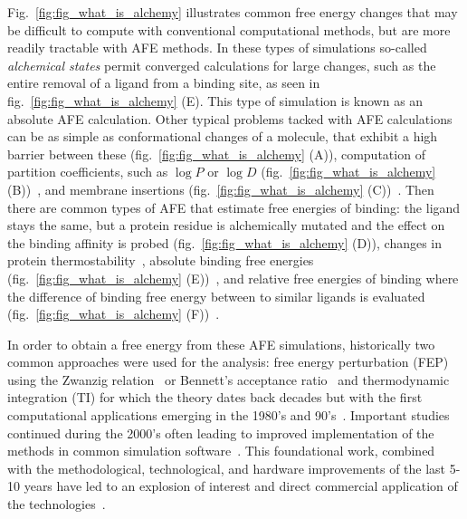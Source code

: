\documentclass[9pt,bestpractices]{livecoms}
\begin{document}
Fig.~\ref{fig:fig_what_is_alchemy} illustrates common free energy changes that may be difficult to compute with conventional computational methods, but are more readily tractable with AFE methods. In these types of simulations so-called \textit{alchemical states} permit converged calculations for large changes, such as the entire removal of a ligand from a binding site, as seen in fig.~\ref{fig:fig_what_is_alchemy} (E). This type of simulation is known as an absolute AFE calculation. Other typical problems tacked with AFE calculations can be as simple as conformational changes of a molecule, that exhibit a high barrier between these (fig.~\ref{fig:fig_what_is_alchemy} (A)), computation of partition coefficients, such as $\log P$ or $\log D$ (fig.~\ref{fig:fig_what_is_alchemy} (B))~\cite{rustenburg2016measuring, bosisio2016blinded}, and membrane insertions (fig.~\ref{fig:fig_what_is_alchemy} (C))~\cite{}. Then there are common types of AFE that estimate free energies of binding: the ligand stays the same, but a protein residue is alchemically mutated and the effect on the binding affinity is probed (fig.~\ref{fig:fig_what_is_alchemy} (D))\cite{hauser2018predicting,aldeghi2018accurate}, changes in protein thermostability~\cite{seeliger2010protein,gapsys2016insights,gapsys2016accurate,aldeghi2019accurate}, absolute binding free energies (fig.~\ref{fig:fig_what_is_alchemy} (E))~\cite{}, and relative free energies of binding where the difference of binding free energy between to similar ligands is evaluated (fig.~\ref{fig:fig_what_is_alchemy} (F))~\cite{}.

In order to obtain a free energy from these AFE simulations, historically two common approaches were used for the analysis: free energy perturbation (FEP) using the Zwanzig relation~\cite{zwanzig1954hightemperature} or Bennett's acceptance ratio~\cite{bennett1976efficient} and thermodynamic integration (TI) for which the theory dates back decades but with the first computational applications emerging in the 1980's and 90's~\cite{kirkwood1935statistical, jorgensen1985monte, kollman1993free, wong1986dynamics, merz1989free}. Important studies continued during the 2000's often leading to improved implementation of the methods in common simulation software~\cite{vanderspoel2005gromacs, mermelstein2018fast, wang2015accurate, hedges2019biosimspace}. This foundational work, combined with the methodological, technological, and hardware improvements of the last 5-10 years have led to an explosion of interest and direct commercial application of the technologies~\cite{}.
\end{document}

